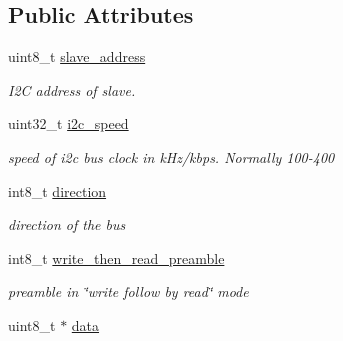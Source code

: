 \subsection*{Public Attributes}
\begin{DoxyCompactItemize}
\item 
\hypertarget{structi2c__packet__t_a894e73263333628188e7ebfd5bba9574}{uint8\+\_\+t \hyperlink{structi2c__packet__t_a894e73263333628188e7ebfd5bba9574}{slave\+\_\+address}}\label{structi2c__packet__t_a894e73263333628188e7ebfd5bba9574}

\begin{DoxyCompactList}\small\item\em I2\+C address of slave. \end{DoxyCompactList}\item 
\hypertarget{structi2c__packet__t_a2d88d17597273370944f2b00f5c38951}{uint32\+\_\+t \hyperlink{structi2c__packet__t_a2d88d17597273370944f2b00f5c38951}{i2c\+\_\+speed}}\label{structi2c__packet__t_a2d88d17597273370944f2b00f5c38951}

\begin{DoxyCompactList}\small\item\em speed of i2c bus clock in k\+Hz/kbps. Normally 100-\/400 \end{DoxyCompactList}\item 
\hypertarget{structi2c__packet__t_afa473c96b36cd10882f10a89cb2ef0de}{int8\+\_\+t \hyperlink{structi2c__packet__t_afa473c96b36cd10882f10a89cb2ef0de}{direction}}\label{structi2c__packet__t_afa473c96b36cd10882f10a89cb2ef0de}

\begin{DoxyCompactList}\small\item\em direction of the bus \end{DoxyCompactList}\item 
\hypertarget{structi2c__packet__t_a75916ebd0d4f45f7fe1535a82e02edde}{int8\+\_\+t \hyperlink{structi2c__packet__t_a75916ebd0d4f45f7fe1535a82e02edde}{write\+\_\+then\+\_\+read\+\_\+preamble}}\label{structi2c__packet__t_a75916ebd0d4f45f7fe1535a82e02edde}

\begin{DoxyCompactList}\small\item\em preamble in \char`\"{}write follow by read\char`\"{} mode \end{DoxyCompactList}\item 
\hypertarget{structi2c__packet__t_ab0c2cdb2d5d32621fe474a63d9801f46}{uint8\+\_\+t $\ast$ \hyperlink{structi2c__packet__t_ab0c2cdb2d5d32621fe474a63d9801f46}{data}}\label{structi2c__packet__t_ab0c2cdb2d5d32621fe474a63d9801f46}


\end{DoxyCompactItemize}
